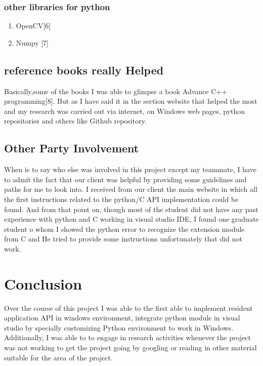 \documentclass[onecolumn, draftclsnofoot,10pt, compsoc]{IEEEtran}
\begin{document}
\subsubsection{other libraries for python}
\begin{enumerate}
\item OpenCV[6]
\item Numpy [7]
\end{enumerate}



\subsection{reference books really Helped}
Basically,some of the books I was able to glimpse a book Advance C++ programming[8]. But as I have said it in the section website that helped the most and my research was carried out via internet, on Windows web pages, python repositories and others like Github repository.
 

\subsection{Other Party Involvement}
When is to say who else was involved in this project except my teammate, I have to admit the fact that our client was helpful by providing some guidelines and paths for me to look into. I received from our client the main website in which all the first instructions related to the python/C API implementation could be found. And from that point on, though most of the student did not have any past experience with python and C working in visual studio IDE, I found one graduate student o whom I showed the python error to recognize the extension module from C and He tried to provide some instructions unfortunately that did not work.


\section{Conclusion}
Over the course of this project I was able to the first able to implement resident application API in windows environment, integrate  python module in visual studio by specially customizing Python environment to work in Windows. Additionally, I was able to  to engage in research activities whenever the project was not working to get the project going by googling or reading in other material suitable for the area of the project.
\end{document}
